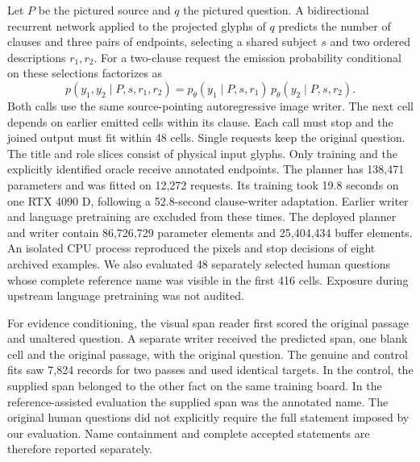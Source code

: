 \documentclass[12pt,a4paper]{article}
\providecommand{\DIFadd}[1]{{\protect\color{blue} \sf #1}} %
\begin{document}
\DIFadd{Let $P$ be the pictured source and $q$ the pictured question. A bidirectional recurrent network applied to the projected glyphs of $q$ predicts the number of clauses and three pairs of endpoints, selecting a shared subject $s$ and two ordered descriptions $r_1,r_2$. For a two-clause request the emission probability conditional on these selections factorizes as
}\[
  p(y_1,y_2\mid P,s,r_1,r_2)=
    p_\theta(y_1\mid P,s,r_1)\,p_\theta(y_2\mid P,s,r_2).
\]
\DIFadd{Both calls use the same source-pointing autoregressive image writer. The next cell depends on earlier emitted cells within its clause. Each call must stop and the joined output must fit within 48 cells. Single requests keep the original question. The title and role slices consist of physical input glyphs. Only training and the explicitly identified oracle receive annotated endpoints. The planner has 138,471 parameters and was fitted on 12,272 requests. Its training took 19.8 seconds on one RTX 4090 D, following a 52.8-second clause-writer adaptation. Earlier writer and language pretraining are excluded from these times. The deployed planner and writer contain 86,726,729 parameter elements and 25,404,434 buffer elements. An isolated CPU process reproduced the pixels and stop decisions of eight archived examples. We also evaluated 48 separately selected human questions whose complete reference name was visible in the first 416 cells. Exposure during upstream language pretraining was not audited.
}

\DIFadd{For evidence conditioning, the visual span reader first scored the original passage and unaltered question. A separate writer received the predicted span, one blank cell and the original passage, with the original question. The genuine and control fits saw 7,824 records for two passes and used identical targets. In the control, the supplied span belonged to the other fact on the same training board. In the reference-assisted evaluation the supplied span was the annotated name. The original human questions did not explicitly require the full statement imposed by our evaluation. Name containment and complete accepted statements are therefore reported separately.
}
\end{document}
